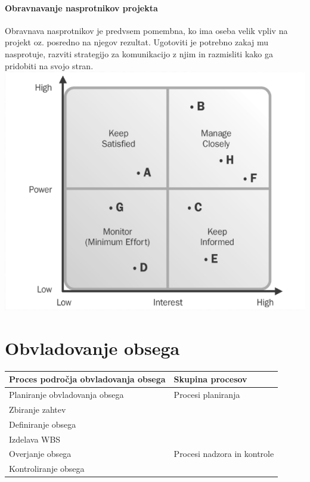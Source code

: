 \documentclass[a4paper,12pt]{report}
\begin{document}
         \paragraph{Obravnavanje nasprotnikov projekta} Obravnava nasprotnikov je predvsem pomembna, ko ima oseba velik vpliv na projekt oz. posredno na njegov rezultat. Ugotoviti je potrebno zakaj mu nasprotuje, razviti strategijo za komunikacijo z njim in razmisliti kako ga pridobiti na svojo stran.
            \includegraphics[scale=0.375]{010.png}

   \section{Obvladovanje obsega}
         \begin{center}
            \begin{tabular}{|l|l|}
               \hline
               \textbf{Proces področja obvladovanja obsega} & \textbf{Skupina procesov} \\
               \hline
               \hline
               Planiranje obvladovanja obsega & Procesi planiranja \\
               Zbiranje zahtev & \\
               Definiranje obsega & \\
               Izdelava WBS & \\
               \hline
               Overjanje obsega & Procesi nadzora in kontrole \\
               Kontroliranje obsega & \\
               \hline
            \end{tabular}
         \end{center}
\end{document}
